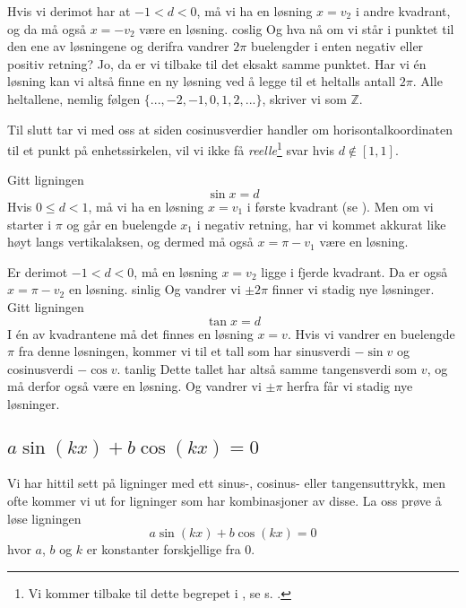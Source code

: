 Hvis vi derimot har at $ {-1< d<0} $, må vi ha en løsning $ {x=v_2} $ i andre kvadrant, og da må også ${ x=-v_2} $ være en løsning.
{coslig}
Og hva nå om vi står i punktet til den ene av løsningene og derifra vandrer $ 2\pi $ buelengder i enten negativ eller positiv retning? Jo, da er vi tilbake til det eksakt samme punktet. Har vi én løsning kan vi altså finne en ny løsning ved å legge til et heltalls antall $ 2\pi $. Alle heltallene, nemlig følgen $ \{...,-2, -1, 0, 1, 2, ... \} $, skriver vi som $ \mathbb{Z} $.\vsk

Til slutt tar vi med oss at siden cosinusverdier handler om horisontalkoordinaten til et punkt på enhetssirkelen, vil vi ikke få \textit{reelle}\footnote{Vi kommer tilbake til dette begrepet i , se s. \pageref{rkmpstart}.} svar hvis $ {d\not \in [1,1]} $.\regv

\coslig
\coslige
\cosligeto
{}
Gitt ligningen 
\begin{equation}
\sin x = d \label{slig}
\end{equation}
Hvis $ {0\leq d <1}$, må vi ha en løsning $ {x=v_1} $ i første kvadrant (se ). Men om vi starter i $ \pi $ og går en buelengde $ x_1 $ i negativ retning, har vi kommet akkurat like høyt langs vertikalaksen, og dermed må også ${x=\pi-v_1} $ være en løsning.\vsk

Er derimot $ {-1< d <0}$, må en løsning $ x=v_2 $ ligge i fjerde kvadrant. Da er også $ x=\pi-v_2 $ en løsning.
{sinlig}
Og vandrer vi $ \pm 2\pi $ finner vi stadig nye løsninger.\regv
\sinlig
\sinlige
{}
Gitt ligningen
\[ \tan x = d \]
I én av kvadrantene må det finnes en løsning ${ x=v }$. Hvis vi vandrer en buelengde $ \pi $ fra denne løsningen, kommer vi til et tall som har sinusverdi $ {-\sin v} $ og cosinusverdi $ {-\cos v} $.
{tanlig}
Dette tallet har altså samme tangensverdi som $ v $, og må derfor også være en løsning. Og vandrer vi $ \pm \pi $ herfra får vi stadig nye løsninger.\newpage
\tanlig
\tanlige
\subsection[$ a\sin (kx) + b\cos (kx) =0 $]{\boldmath $ a\sin (kx) + b\cos (kx) =0 $}
Vi har hittil sett på ligninger med ett sinus-, cosinus- eller tangensuttrykk, men ofte kommer vi ut for ligninger som har kombinasjoner av disse. La oss prøve å løse ligningen
\begin{equation}\label{trikomblig0}
a\sin (kx) + b\cos (kx) =0  
\end{equation}
hvor $ a $, $ b $ og $ k $ er konstanter forskjellige fra 0. \vsk

